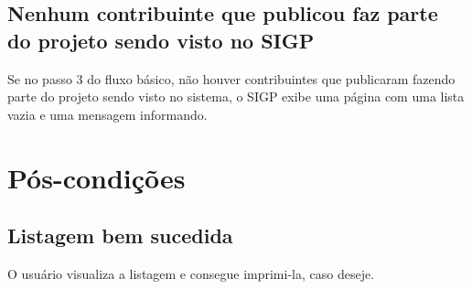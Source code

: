 \documentclass[11pt, a4paper,oneside]{book}
\begin{document}
\subsection{Nenhum contribuinte que publicou faz parte do projeto sendo visto no SIGP}
Se no passo $3$ do fluxo básico, não houver contribuintes que publicaram fazendo parte do projeto sendo visto no sistema, o SIGP exibe uma página com uma lista vazia e uma mensagem informando.

%
%
%
%

\section{Pós-condições}

\subsection{Listagem bem sucedida}

O usuário visualiza a listagem e consegue imprimi-la, caso deseje.

%
\end{document}
